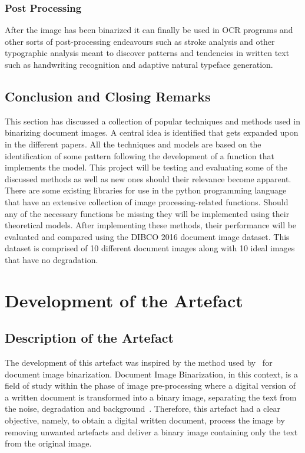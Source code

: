 \documentclass[a4paper, 12pt]{report}
\begin{document}
\subsection{Post Processing}
After the image has been binarized it can finally be used in OCR programs and other sorts of post-processing endeavours such as stroke analysis and other typographic analysis meant to discover patterns and tendencies in written text such as handwriting recognition and adaptive natural typeface generation.

\section{Conclusion and Closing Remarks}
This section has discussed a collection of popular techniques and methods used in binarizing document images. A central idea is identified that gets expanded upon in the different papers. All the techniques and models are based on the identification of some pattern following the development of a function that implements the model.
This project will be testing and evaluating some of the discussed methods as well as new ones should their relevance become apparent. There are some existing libraries for use in the python programming language that have an extensive collection of image processing-related functions. Should any of the necessary functions be missing they will be implemented using their theoretical models.
After implementing these methods, their performance will be evaluated and compared using the DIBCO 2016 document image dataset. This dataset is comprised of 10 different document images along with 10 ideal images that have no degradation.







\chapter{Development of the Artefact}

\section{Description of the Artefact}
The development of this artefact was inspired by the method used by~\cite{su2012robust} for document image binarization. Document Image Binarization, in this context, is a field of study within the phase of image pre-processing where a digital version of a written document is transformed into a binary image, separating the text from the noise, degradation and background~\cite{su2012robust}. Therefore, this artefact had a clear objective, namely, to obtain a digital written document, process the image by removing unwanted artefacts and deliver a binary image containing only the text from the original image.\par
\end{document}
